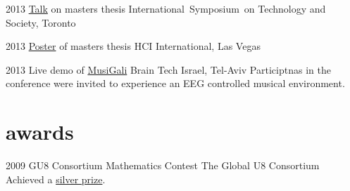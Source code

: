 \documentclass[]{friggeri-cv}  %
\begin{document}
\begin{entrylist}

    \entry
    {2013}
    {\href{http://www.slideshare.net/Nagasaki45/audioonly-augmented-reality-system-for-social-interaction}{Talk} {\normalfont on masters thesis}}
    {International Symposium on Technology and Society, Toronto}
    {}

\end{entrylist}
\begin{entrylist}

    \entry
    {2013}
    {\href{http://www.tomgurion.me/pdfs/HCI2013 poster.pdf}{Poster} {\normalfont of masters thesis}}
    {HCI International, Las Vegas}
    {}

\end{entrylist}
\begin{entrylist}

    \entry
    {2013}
    {Live demo {\normalfont of \href{http://www.tomgurion.me/musigali.html}{MusiGali}}}
    {Brain Tech Israel, Tel-Aviv}
    {Participtnas in the conference were invited to experience an EEG controlled musical environment.}

\end{entrylist}


\section{awards}

\begin{entrylist}

    \entry
    {2009}
    {GU8 Consortium Mathematics Contest}
    {The Global U8 Consortium}
    {Achieved a \href{http://www.tomgurion.me/pdfs/U8 mathematic contest - silver prize.pdf}{silver prize}.}

\end{entrylist}
\end{document}
